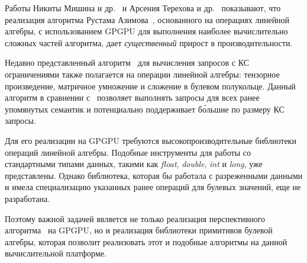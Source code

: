 Работы Никиты Мишина и др.~\cite{inproceedings:cfpq_matrix_evaluation} и Арсения Терехова и др.~\cite{inproceedings:cfqp_matrix_with_single_source} показывают, что реализация алгоритма Рустама Азимова~\cite{inproceedings:matrix_cfpq}, основанного на операциях линейной алгебры, с использованием GPGPU для выполнения наиболее вычислительно сложных частей алгоритма, дает \textit{существенный} прирост в производительности.

Недавно представленный алгоритм~\cite{inbook:kronecker_cfpq_adbis} для вычисления запросов с КС ограничениями также полагается на операции линейной алгебры: тензорное произведение, матричное умножение и сложение в булевом полукольце. Данный алгоритм в сравнении с~\cite{inproceedings:cfqp_matrix_with_single_source} позволяет выполнять запросы для всех ранее упомянутых семантик и потенциально поддерживает б\'ольшие по размеру КС запросы.

Для его реализации на GPGPU требуются высокопроизводительные библиотеки операций линейной алгебры. Подобные инструменты для работы со стандартными типами данных, такими как \textit{float}, \textit{double}, \textit{int} и \textit{long}, уже представлены. Однако библиотека, которая бы работала с разреженными данными и имела специализацию указанных ранее операций для булевых значений, еще не разработана. 

Поэтому важной задачей является не только реализация перспективного алгоритма~\cite{inbook:kronecker_cfpq_adbis} на GPGPU, но и реализация библиотеки примитивов булевой алгебры, которая позволит реализовать этот и подобные алгоритмы на данной вычислительной платформе.
